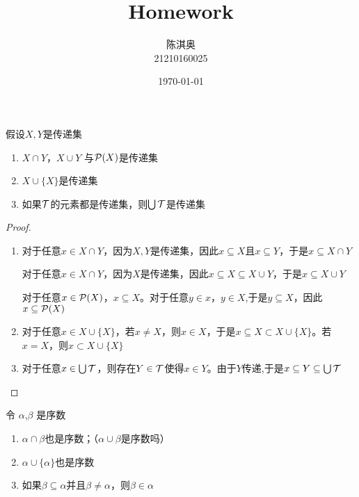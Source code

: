 \documentclass[11pt]{article}
\author{陈淇奥\\21210160025}
\date{\today}
\title{Homework}
\begin{document}
\maketitle
\tableofcontents

\begin{exercise}[1.3.22]
假设\(X,Y\)是传递集
\begin{enumerate}
\item \(X\cap Y\)，\(X\cup Y\) 与\(\mathcal{P}(X)\)是传递集
\item \(X\cup\{X\}\)是传递集
\item 如果\(\mathcal{T}\)的元素都是传递集，则\(\bigcup\mathcal{T}\)是传递集
\end{enumerate}
\end{exercise}

\begin{proof}
\begin{enumerate}
\item 对于任意\(x\in X\cap Y\)，因为\(X,Y\)是传递集，因此\(x\subseteq X\)且\(x\subseteq Y\)，于是\(x\subseteq X\cap Y\)

对于任意\(x\in X\cap Y\)，因为\(X\)是传递集，因此\(x\subseteq X\subseteq X\cup Y\)，于是\(x\subseteq X\cup Y\)

对于任意\(x\in\mathcal{P}(X)\)，\(x\subseteq X\)。对于任意\(y\in x\)，\(y\in X\),于是\(y\subseteq X\)，因此\(x\subseteq\mathcal{P}(X)\)

\item 对于任意\(x\in X\cup\{X\}\)，若\(x\neq X\)，则\(x\in X\)，于是\(x\subseteq X\subset X\cup\{X\}\)。若\(x=X\)，则\(x\subset X\cup\{X\}\)

\item 对于任意\(x\in\bigcup\mathcal{T}\)，则存在\(Y\in\mathcal{T}\)使得\(x\in Y\)。由于\(Y\)传递,于是\(x\subseteq Y\subseteq\bigcup\mathcal{T}\)
\end{enumerate}
\end{proof}

\begin{exercise}[1.3.27]
令 \(\alpha\),\(\beta\) 是序数
\begin{enumerate}
\item \(\alpha\cap\beta\)也是序数；（\(\alpha\cup\beta\)是序数吗）
\item \(\alpha\cup\{\alpha\}\)也是序数
\item 如果\(\beta\subseteq\alpha\)并且\(\beta\neq\alpha\)，则\(\beta\in\alpha\)
\end{enumerate}
\end{exercise}
\end{document}
